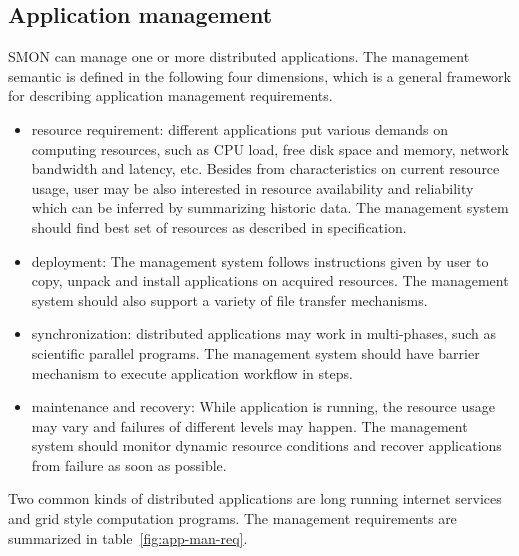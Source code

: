 \subsection{Application management}

SMON can manage one or more distributed applications. The
management semantic is defined in the following four
dimensions, which is a general framework for describing
application management requirements.

\begin{itemize}

  \item resource requirement: different applications put
  various demands on computing resources, such as CPU load,
  free disk space and memory, network bandwidth and latency,
  etc. Besides from characteristics on current resource
  usage, user may be also interested in resource availability
  and reliability which can be inferred by summarizing
  historic data. The management system should find best set
  of resources as described in specification.

  \item deployment: The management system follows
  instructions given by user to copy, unpack and install
  applications on acquired resources. The management system
  should also support a variety of file transfer mechanisms.

  \item synchronization: distributed applications may work
  in multi-phases, such as scientific parallel programs.
  The management system should have barrier mechanism to
  execute application workflow in steps.

  \item maintenance and recovery: While application is running,
  the resource usage may vary and failures of different
  levels may happen. The management system should monitor
  dynamic resource conditions and recover applications from
  failure as soon as possible.

\end{itemize}

Two common kinds of distributed applications are long
running internet services and grid style computation
programs. The management requirements are summarized in
table~\ref{fig:app-man-req}.

